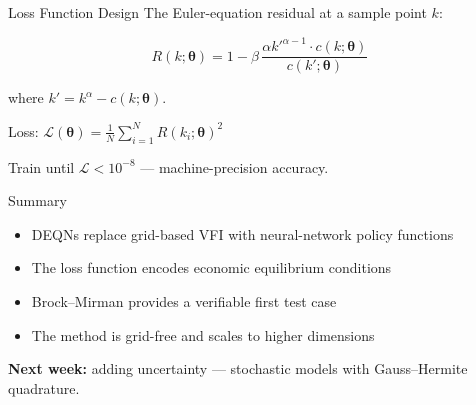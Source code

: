 \documentclass[aspectratio=169, 10pt]{beamer}
\begin{document}
\begin{frame}{Loss Function Design}
The Euler-equation residual at a sample point $k$:

$$R(k; \boldsymbol{\theta}) = 1 - \beta\,\frac{\alpha k'^{\alpha-1} \cdot c(k; \boldsymbol{\theta})}{c(k'; \boldsymbol{\theta})}$$

where $k' = k^\alpha - c(k; \boldsymbol{\theta})$.

\bigskip
Loss: $\mathcal{L}(\boldsymbol{\theta}) = \frac{1}{N}\sum_{i=1}^{N} R(k_i; \boldsymbol{\theta})^2$

\bigskip
Train until $\mathcal{L} < 10^{-8}$ --- machine-precision accuracy.
\end{frame}

\begin{frame}{Summary}
\begin{itemize}
\item DEQNs replace grid-based VFI with neural-network policy functions
\item The loss function encodes economic equilibrium conditions
\item Brock--Mirman provides a verifiable first test case
\item The method is grid-free and scales to higher dimensions
\end{itemize}

\bigskip
\textbf{Next week:} adding uncertainty --- stochastic models with Gauss--Hermite quadrature.
\end{frame}
\end{document}
